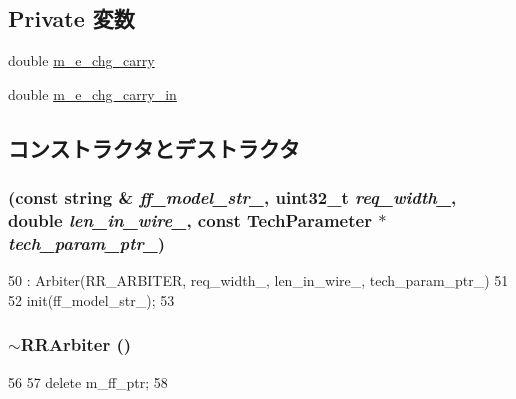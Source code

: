 \subsection*{Private 変数}
\begin{DoxyCompactItemize}
\item 
double \hyperlink{classRRArbiter_aa1a5911d89a454e02f2f20019d44d2cf}{m\_\-e\_\-chg\_\-carry}
\item 
double \hyperlink{classRRArbiter_aeb10b57399d5501679bdb3cdaf33af92}{m\_\-e\_\-chg\_\-carry\_\-in}
\end{DoxyCompactItemize}


\subsection{コンストラクタとデストラクタ}
\hypertarget{classRRArbiter_a87e05ea60c9d10abe5a0195f10ae2585}{
\subsubsection[{RRArbiter}]{ (const string \& {\em ff\_\-model\_\-str\_\-}, \/  {\bf uint32\_\-t} {\em req\_\-width\_\-}, \/  double {\em len\_\-in\_\-wire\_\-}, \/  const {\bf TechParameter} $\ast$ {\em tech\_\-param\_\-ptr\_\-})}}
\label{classRRArbiter_a87e05ea60c9d10abe5a0195f10ae2585}



\begin{DoxyCode}
50           : Arbiter(RR_ARBITER, req_width_, len_in_wire_, tech_param_ptr_)
51 {
52     init(ff_model_str_);
53 }
\end{DoxyCode}
\hypertarget{classRRArbiter_a04a00082f0532adf4a3228317836eb6e}{
\subsubsection[{$\sim$RRArbiter}]{\setlength{\rightskip}{0pt plus 5cm}$\sim${\bf RRArbiter} ()}}
\label{classRRArbiter_a04a00082f0532adf4a3228317836eb6e}



\begin{DoxyCode}
56 {
57     delete m_ff_ptr;
58 }
\end{DoxyCode}


